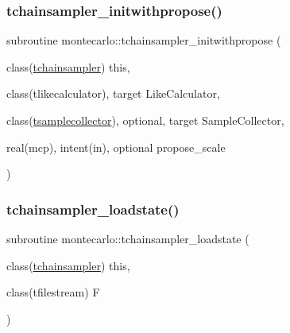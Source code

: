 \subsubsection{\texorpdfstring{tchainsampler\+\_\+initwithpropose()}{tchainsampler\_initwithpropose()}}
{\footnotesize\ttfamily subroutine montecarlo\+::tchainsampler\+\_\+initwithpropose (\begin{DoxyParamCaption}\item[{class(\mbox{\hyperlink{structmontecarlo_1_1tchainsampler}{tchainsampler}})}]{this,  }\item[{class(tlikecalculator), target}]{Like\+Calculator,  }\item[{class(\mbox{\hyperlink{structmontecarlo_1_1tsamplecollector}{tsamplecollector}}), optional, target}]{Sample\+Collector,  }\item[{real(mcp), intent(in), optional}]{propose\+\_\+scale }\end{DoxyParamCaption})\hspace{0.3cm}{\ttfamily [private]}}

\mbox{\label{namespacemontecarlo_a828a7ad845f1b5a7f01bfb3ccc95ac32}} 
\subsubsection{\texorpdfstring{tchainsampler\+\_\+loadstate()}{tchainsampler\_loadstate()}}
{\footnotesize\ttfamily subroutine montecarlo\+::tchainsampler\+\_\+loadstate (\begin{DoxyParamCaption}\item[{class(\mbox{\hyperlink{structmontecarlo_1_1tchainsampler}{tchainsampler}})}]{this,  }\item[{class(tfilestream)}]{F }\end{DoxyParamCaption})\hspace{0.3cm}{\ttfamily [private]}}

\mbox{\label{namespacemontecarlo_a61aacaca86a2550ede828d05b6b4a00f}} 
